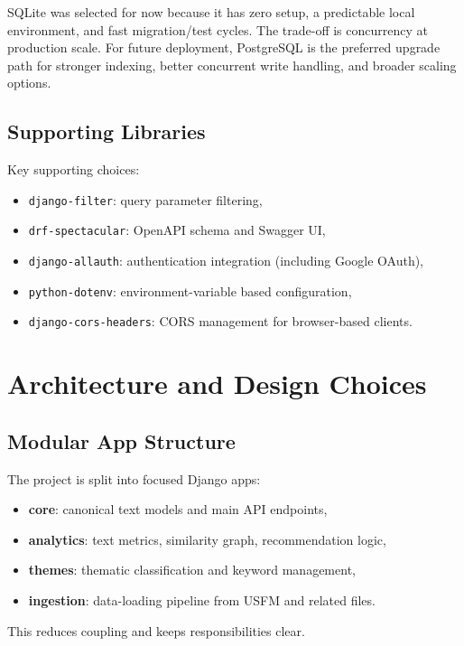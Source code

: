 \documentclass[11pt,a4paper]{article}
\begin{document}
SQLite was selected for now because it has zero setup, a predictable local environment, and fast migration/test cycles. The trade-off is concurrency at production scale. For future deployment, PostgreSQL is the preferred upgrade path for stronger indexing, better concurrent write handling, and broader scaling options.

\subsection{Supporting Libraries}
Key supporting choices:
\begin{itemize}[leftmargin=*]
	\item \texttt{django-filter}: query parameter filtering,
	\item \texttt{drf-spectacular}: OpenAPI schema and Swagger UI,
	\item \texttt{django-allauth}: authentication integration (including Google OAuth),
	\item \texttt{python-dotenv}: environment-variable based configuration,
	\item \texttt{django-cors-headers}: CORS management for browser-based clients.
\end{itemize}

\section{Architecture and Design Choices}
\subsection{Modular App Structure}
The project is split into focused Django apps:
\begin{itemize}[leftmargin=*]
	\item \textbf{core}: canonical text models and main API endpoints,
	\item \textbf{analytics}: text metrics, similarity graph, recommendation logic,
	\item \textbf{themes}: thematic classification and keyword management,
	\item \textbf{ingestion}: data-loading pipeline from USFM and related files.
\end{itemize}
This reduces coupling and keeps responsibilities clear.
\end{document}
